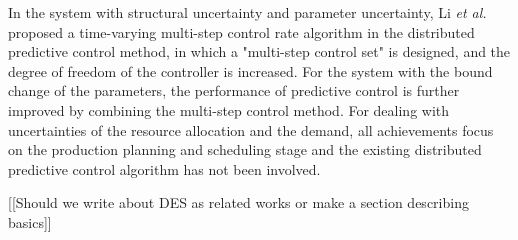 \documentclass[runningheads]{llncs}
\begin{document}
In the system with structural uncertainty and parameter uncertainty, Li \emph{et al.} \cite{lidewei} proposed a time-varying multi-step control rate algorithm in the distributed predictive control method, in which a "multi-step control set" is designed, and the degree of freedom of the controller is increased. For the system with the bound change of the parameters, the performance of predictive control is further improved by combining the multi-step control method. For dealing with uncertainties of the resource allocation and the demand, all achievements focus on the production planning and scheduling stage and the existing distributed predictive control algorithm has not been involved.

[[Should we write about DES as related works or make a section describing basics]]


\end{document}
